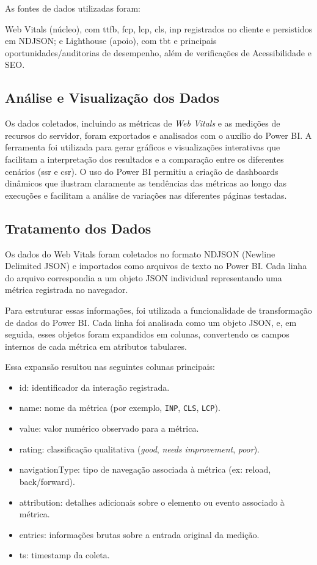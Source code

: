 As fontes de dados utilizadas foram: {Web Vitals (núcleo), com \acrshort{ttfb}, \acrshort{fcp}, \acrshort{lcp}, \acrshort{cls}, \acrshort{inp} registrados no cliente e persistidos em NDJSON; e Lighthouse (apoio), com \acrshort{tbt} e principais oportunidades/auditorias de desempenho, além de verificações de Acessibilidade e SEO.

\subsection{Análise e Visualização dos Dados}
Os dados coletados, incluindo as métricas de \textit{Web Vitals} e as medições de recursos do servidor, foram exportados e analisados com o auxílio do Power BI. A ferramenta foi utilizada para gerar gráficos e visualizações interativas que facilitam a interpretação dos resultados e a comparação entre os diferentes cenários (\acrshort{ssr} e \acrshort{csr}). O uso do Power BI permitiu a criação de dashboards dinâmicos que ilustram claramente as tendências das métricas ao longo das execuções e facilitam a análise de variações nas diferentes páginas testadas.

\subsection{Tratamento dos Dados}
Os dados do Web Vitals foram coletados no formato NDJSON (Newline Delimited JSON) e importados como arquivos de texto no Power BI. Cada linha do arquivo correspondia a um objeto JSON individual representando uma métrica registrada no navegador.

Para estruturar essas informações, foi utilizada a funcionalidade de transformação de dados do Power BI. Cada linha foi analisada como um objeto JSON, e, em seguida, esses objetos foram expandidos em colunas, convertendo os campos internos de cada métrica em atributos tabulares.

Essa expansão resultou nas seguintes colunas principais:

\begin{itemize}
    \item id: identificador da interação registrada.
    \item name: nome da métrica (por exemplo, \texttt{INP}, \texttt{CLS}, \texttt{LCP}).
    \item value: valor numérico observado para a métrica.
    \item rating: classificação qualitativa (\textit{good}, \textit{needs improvement}, \textit{poor}).
    \item navigationType: tipo de navegação associada à métrica (ex: reload, back/forward).
    \item attribution: detalhes adicionais sobre o elemento ou evento associado à métrica.
    \item entries: informações brutas sobre a entrada original da medição.
    \item ts: timestamp da coleta.
\end{itemize}

}
